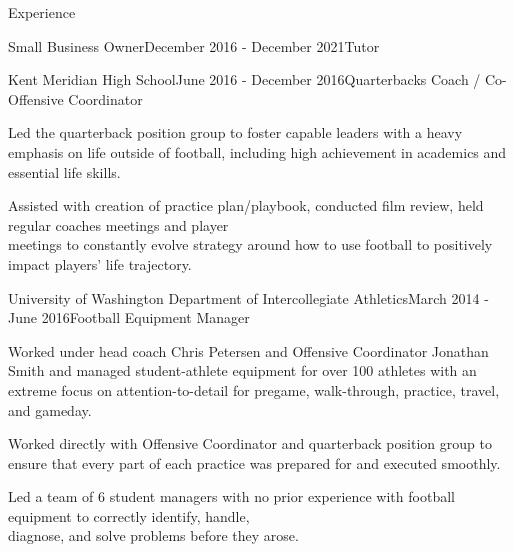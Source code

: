 \documentclass[
	11pt, %
]{resume} %
\begin{document}
\begin{rSection}{Experience}
\begin{rSubsection}{Small Business Owner}{December 2016 - December 2021}{Tutor}{}
        \end{rSubsection}

        \begin{rSubsection}{Kent Meridian High School}{June 2016 - December 2016}{Quarterbacks Coach / Co-Offensive Coordinator}{}
        
            \item Led the quarterback position group to foster capable leaders with a heavy emphasis on life outside of football, including high achievement in academics and essential life skills.
            \item Assisted with creation of practice plan/playbook, conducted film review, held regular coaches meetings and player \\meetings to constantly evolve strategy around how to use football to positively impact players' life trajectory.

            
        \end{rSubsection}

        \begin{rSubsection}{University of Washington Department of Intercollegiate Athletics}{March 2014 - June 2016}{Football Equipment Manager}{}
        
            \item Worked under head coach Chris Petersen and Offensive Coordinator Jonathan Smith and managed student-athlete equipment for over 100 athletes with an extreme focus on attention-to-detail for pregame, walk-through, practice, travel, and gameday.

            \item Worked directly with Offensive Coordinator and quarterback position group to ensure that every part of each practice was prepared for and executed smoothly.

            \item Led a team of 6 student managers with no prior experience with football equipment to correctly identify, handle, \\diagnose, and solve problems before they arose.

            
            
        \end{rSubsection}
\end{rSection}
\end{document}
